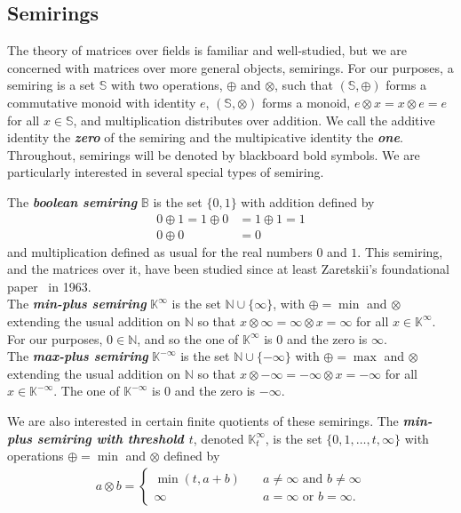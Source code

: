 \documentclass[11pt]{article}
\newcommand{\defn}[1]{\textbf{\textit{#1}}}
\numberwithin{equation}{section}
\newcommand{\B}{\mathbb{B}}
\newcommand{\N}{\mathbb{N}}
\newcommand{\K}{\mathbb{K}}
\begin{document}
\subsection{Semirings}
The theory of matrices over fields is familiar and well-studied, but we are
concerned with matrices over more general objects, semirings. For our purposes,
a semiring is a set $\mathbb{S}$ with two operations, $\oplus$ and $\otimes$,
such that $(\mathbb{S}, \oplus)$ forms a commutative monoid with identity $e$,
$(\mathbb{S}, \otimes)$ forms a monoid, $e\otimes x = x\otimes e = e$ for all $x
\in \mathbb{S}$, and multiplication distributes over addition. We call the
additive identity the \defn{zero} of the semiring and the multipicative identity
the \defn{one}. Throughout, semirings will be denoted by blackboard bold
symbols. We are particularly interested in several special types of semiring.

The \defn{boolean semiring} $\B$ is the set $\{0, 1\}$ with addition defined by 
\begin{align*}
  0 \oplus 1 = 1 \oplus 0 &= 1 \oplus 1 = 1 \\
  0 \oplus 0 &= 0
\end{align*}
and multiplication defined as usual for the real numbers $0$ and $1$. This
semiring, and the matrices over it, have been studied since at least Zaretskii's
foundational paper~\cite{Zaretskii1963aa} in 1963. \\

The \defn{min-plus semiring} $\K^{\infty}$ is the set $\N \cup \{\infty\}$, with
$\oplus = \min$ and $\otimes$ extending the usual addition on $\N$ so that
$x\otimes\infty = \infty\otimes x = \infty$ for all $x \in \K^{\infty}$. For our
purposes, $0 \in \N$, and so the one of $\K^{\infty}$ is $0$ and the zero is
$\infty$. \\ 
The \defn{max-plus semiring} $\K^{-\infty}$ is the set $\N \cup \{-\infty\}$ with
$\oplus = \max$ and $\otimes$ extending the usual addition on $\N$ so that
$x\otimes-\infty = -\infty\otimes x = -\infty$ for all $x \in \K^{-\infty}$. The
one of $\K^{-\infty}$ is $0$ and the zero is $-\infty$.

We are also interested in certain finite quotients of these semirings. The
\defn{min-plus semiring with threshold $t$}, denoted $\K^{\infty}_t$, is the set
$\{0, 1, \ldots, t, \infty\}$ with operations $\oplus = \min$ and $\otimes$
defined by
\begin{align*}
  a \otimes b = \begin{cases}
    \min(t, a + b) \quad &\text{$a \neq \infty$ and $b \neq \infty$} \\
    \infty \quad &\text{$a = \infty$ or $b = \infty$}.
  \end{cases}
\end{align*}
\end{document}
